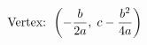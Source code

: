 \documentclass[preview]{standalone}
\begin{document}
\begin{align*}
\special{dvisvgm:raw <g id='unique000'>}\text{Vertex: } \left(-\frac{b}{2a},\; c - \frac{b^2}{4a}\right)\special{dvisvgm:raw </g>}
\end{align*}
\end{document}
